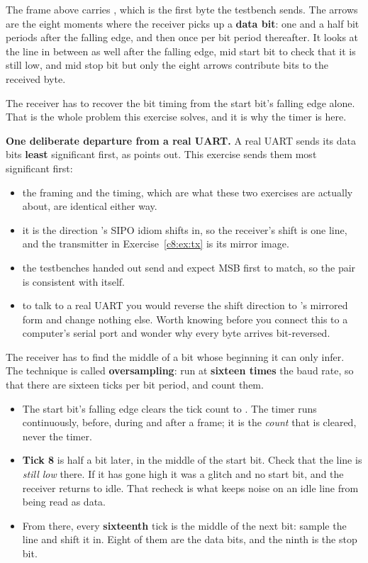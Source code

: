 The frame above carries , which is the first byte the testbench sends. The arrows are
the eight moments where the receiver picks up a \textbf{data bit}: one and a half bit periods after
the falling edge, and then once per bit period thereafter. It looks at the line in between as well
\textemdash{} after the falling edge, mid start bit to check that it is still low, and mid stop bit
\textemdash{} but only the eight arrows contribute bits to the received byte.

The receiver has to recover the bit timing from the start bit's falling edge alone. That is the
whole problem this exercise solves, and it is why the timer is here.

\begin{aside}
\textbf{One deliberate departure from a real UART.} A real UART sends its data bits
\textbf{least} significant first, as  points out. This exercise sends them most
significant first:
\begin{itemize}
  \item the framing and the timing, which are what these two exercises are actually about, are
    identical either way.
  \item it is the direction 's SIPO idiom shifts in, so the receiver's shift is
    one line, and the transmitter in Exercise~\ref{c8:ex:tx} is its mirror image.
  \item the testbenches handed out send and expect MSB first to match, so the pair is consistent
    with itself.
  \item to talk to a real UART you would reverse the shift direction to 's
    mirrored form and change nothing else. Worth knowing before you connect this to a computer's
    serial port and wonder why every byte arrives bit-reversed.
\end{itemize}
\end{aside}

The receiver has to find the middle of a bit whose beginning it can only infer. The technique is
called \textbf{oversampling}: run  at \textbf{sixteen times} the baud rate, so that there
are sixteen ticks per bit period, and count them.
\begin{itemize}
  \item The start bit's falling edge clears the tick count to . The timer runs continuously,
    before, during and after a frame; it is the \emph{count} that is cleared, never the timer.
  \item \textbf{Tick 8} is half a bit later, in the middle of the start bit. Check that the line is
    \emph{still low} there. If it has gone high it was a glitch and no start bit, and the receiver
    returns to idle. That recheck is what keeps noise on an idle line from being read as data.
  \item From there, every \textbf{sixteenth} tick is the middle of the next bit: sample the line and
    shift it in. Eight of them are the data bits, and the ninth is the stop bit.
\end{itemize}

